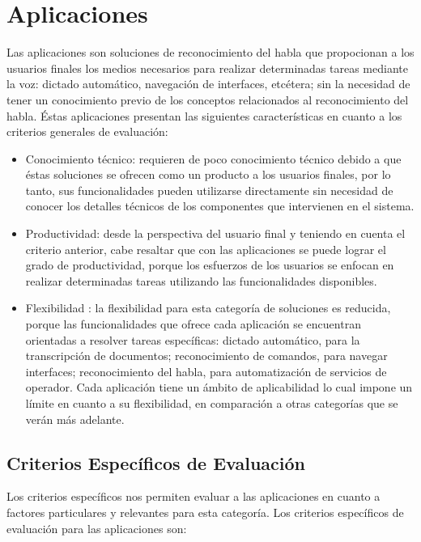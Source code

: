 \section{Aplicaciones}
\label{sec:aplicaciones}

Las aplicaciones son soluciones de reconocimiento del habla que propocionan
a los usuarios finales los medios necesarios para realizar determinadas tareas mediante
la voz: dictado autom\'atico, navegaci\'on de interfaces, etc\'etera; sin
la necesidad de tener un conocimiento previo de los conceptos relacionados al
reconocimiento del habla. \'Estas aplicaciones presentan las siguientes 
caracter\'isticas en cuanto a los criterios generales de evaluaci\'on:

\begin{itemize}
    \item Conocimiento t\'ecnico: requieren de poco conocimiento  t\'ecnico debido a que \'estas
        soluciones se ofrecen como un producto a los usuarios finales, por lo tanto, sus funcionalidades
        pueden utilizarse directamente sin necesidad de conocer los detalles t\'ecnicos de
        los componentes que intervienen en el sistema.
    \item Productividad: desde la perspectiva del usuario final y teniendo en cuenta el criterio anterior, cabe resaltar que con
        las aplicaciones se puede lograr el grado de productividad, porque los esfuerzos
        de los usuarios se enfocan en realizar determinadas tareas utilizando las funcionalidades
        disponibles.
    \item Flexibilidad : la flexibilidad para esta categor\'ia de soluciones es reducida, porque las
        funcionalidades que ofrece cada aplicaci\'on se encuentran orientadas a resolver tareas
        espec\'ificas: dictado autom\'atico, para la transcripci\'on de documentos; reconocimiento
        de comandos, para navegar interfaces; reconocimiento del habla, para 
        automatizaci\'on de servicios de operador. Cada aplicaci\'on tiene un \'ambito de aplicabilidad
        lo cual impone un l\'imite en cuanto a su flexibilidad, en comparaci\'on a otras categor\'ias que
        se ver\'an m\'as adelante.
\end{itemize}

\subsection{Criterios Espec\'ificos de Evaluaci\'on}

Los criterios espec\'ificos nos permiten evaluar a las aplicaciones en cuanto a factores
particulares y relevantes para esta categor\'ia. Los criterios 
espec\'ificos de evaluaci\'on para las aplicaciones son:

